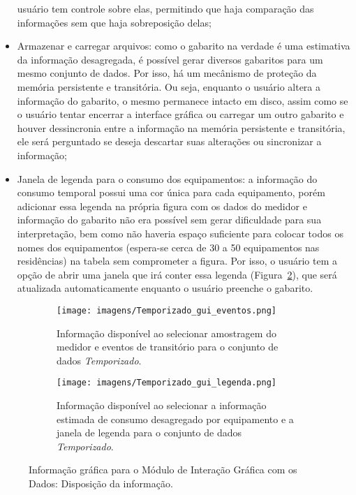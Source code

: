 \begin{itemize}
usuário tem controle sobre elas, permitindo que haja comparação das
informações sem que haja sobreposição delas;
\item Armazenar e carregar arquivos: como o gabarito na verdade é uma
estimativa da informação desagregada, é possível gerar diversos
gabaritos para um mesmo conjunto de dados. Por isso, há um mecânismo de
proteção da memória persistente e transitória. Ou seja, enquanto o
usuário altera a informação do gabarito, o mesmo permanece intacto em
disco, assim como se o usuário tentar encerrar a interface gráfica ou
carregar um outro gabarito e houver dessincronia entre a informação
na memória persistente e transitória, ele será perguntado se deseja
descartar suas alterações ou sincronizar a informação;
\item Janela de legenda para o consumo dos equipamentos: a informação do
consumo temporal possui uma cor única para cada equipamento, porém
adicionar essa legenda na própria figura com os dados do medidor e
informação do gabarito não era possível sem gerar dificuldade para sua
interpretação, bem como não haveria espaço suficiente para colocar
todos os nomes dos equipamentos (espera-se cerca de 30 a 50 equipamentos nas
residências) na tabela sem comprometer a figura. Por isso, o usuário
tem a opção de abrir uma janela que irá conter essa legenda
(Figura~\ref{fig:temporizado_gui_legenda}), que será atualizada
automaticamente enquanto o usuário preenche o gabarito.
\end{itemize}

\begin{figure*}[p!]
  \begin{center}
    \begin{subfigure}[c]{\textwidth}
      \texttt{[image: imagens/Temporizado\_gui\_eventos.png]}
      \caption{Informação disponível ao selecionar amostragem do
medidor e eventos de transitório para o conjunto de dados \emph{Temporizado}.}
      \label{fig:temporizado_gui_eventos}
    \end{subfigure}
    \hfill
    \begin{subfigure}[c]{\textwidth}
      \texttt{[image: imagens/Temporizado\_gui\_legenda.png]}
      \caption{Informação disponível ao selecionar a informação
estimada de consumo desagregado por equipamento e a janela de legenda
para o conjunto de dados \emph{Temporizado}.}
      \label{fig:temporizado_gui_legenda}
    \end{subfigure}
  \end{center}
\caption{Informação gráfica para o Módulo de Interação Gráfica com os
Dados: Disposição da informação.}
\label{fig:gui_informacao} \end{figure*}



